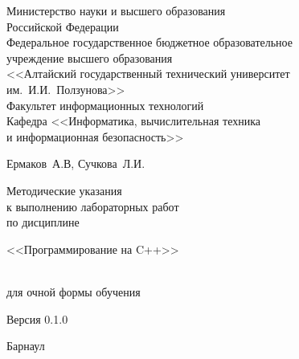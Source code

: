\documentclass[main.tex]{subfiles}
\begin{document}
\begin{titlepage}
\begin{center}
Министерство науки и высшего образования\\
Российской Федерации\\
Федеральное государственное бюджетное образовательное\\
учреждение высшего образования\\
<<Алтайский государственный технический университет\\
им.~И.И.~Ползунова>>\\
Факультет информационных технологий\\
Кафедра <<Информатика, вычислительная техника\\
и информационная безопасность>>

\vfill

Ермаков~А.В, Сучкова~Л.И.

\vspace{10pt}

Методические указания\\
к выполнению лабораторных работ\\
по дисциплине\\
\begin{Large}<<Программирование на C++>>\end{Large}\\
для очной формы обучения

\vspace{10pt}

Версия 0.1.0

\vfill

Барнаул \the\year
\end{center}
\end{titlepage} 
\end{document}
